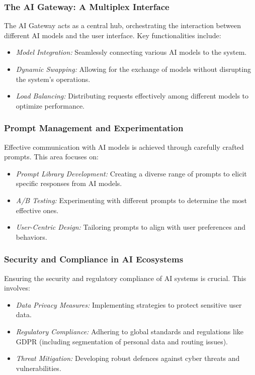 \subsubsection{The AI Gateway: A Multiplex Interface}
The AI Gateway acts as a central hub, orchestrating the interaction between different AI models and the user interface. Key functionalities include:
\begin{itemize}
    \item \textit{Model Integration:} Seamlessly connecting various AI models to the system.
    \item \textit{Dynamic Swapping:} Allowing for the exchange of models without disrupting the system’s operations.
    \item \textit{Load Balancing:} Distributing requests effectively among different models to optimize performance.
\end{itemize}

\subsubsection{Prompt Management and Experimentation}
Effective communication with AI models is achieved through carefully crafted prompts. This area focuses on:
\begin{itemize}
    \item \textit{Prompt Library Development:} Creating a diverse range of prompts to elicit specific responses from AI models.
    \item \textit{A/B Testing:} Experimenting with different prompts to determine the most effective ones.
    \item \textit{User-Centric Design:} Tailoring prompts to align with user preferences and behaviors.
\end{itemize}

\subsubsection{Security and Compliance in AI Ecosystems}
Ensuring the security and regulatory compliance of AI systems is crucial. This involves:
\begin{itemize}
    \item \textit{Data Privacy Measures:} Implementing strategies to protect sensitive user data.
    \item \textit{Regulatory Compliance:} Adhering to global standards and regulations like GDPR (including segmentation of personal data and routing issues).
    \item \textit{Threat Mitigation:} Developing robust defences against cyber threats and vulnerabilities.
\end{itemize}

